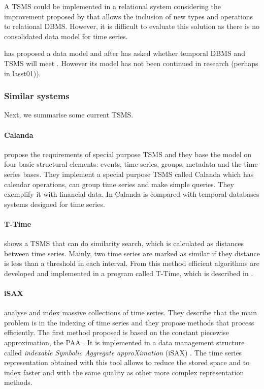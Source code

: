 A TSMS could be implemented in a relational system considering the improvement proposed by \textcite{stonebraker86} that allows the inclusion of new types and operations to relational DBMS. However, it is difficult to evaluate this solution as there is no consolidated data model  for time series. 

\textcite{dreyer94} has proposed a data model and after has asked whether temporal DBMS and TSMS will meet \parencite{schmidt95}. However its model has not been continued in research (perhaps in lasst01)).



\subsubsection{Similar systems}
Next, we summarise some current TSMS.

\paragraph{Calanda} \textcite{dreyer94} propose the requirements of special purpose TSMS and they  base the model on four basic structural elements: events, time series, groups, metadata and the time series bases. They implement a special purpose TSMS \parencite{dreyer94b,dreyer95,dreyer95b} called Calanda which has calendar operations, can group time series and make simple queries. They exemplify it with financial data. In \cite{schmidt95} Calanda is compared with temporal databases systems designed for time series.


\paragraph{T-Time}  \textcite{assfalg08:thesis} shows a TSMS that can do similarity search, which is calculated as distances between time series. Mainly, two time series are marked as similar if they distance is less than a threshold in each interval. From this method efficient algorithms are developed and implemented in a program called T-Time, which is described in \cite{assfalg08:ttime}.

 
\paragraph{iSAX} \textcite{keogh08:isax,keogh10:isax} analyse and index massive collections of time series. They describe that the main problem is in the indexing of time series and they propose methods that process efficiently. The first method proposed is based on the constant piecewise approximation, the PAA \parencite{keogh00}. It is implemented in a data management structure called \emph{indexable Symbolic Aggregate approXimation} (iSAX) \parencite{isax}. The time series representation obtained with this tool allows to reduce the stored space and to index faster and with the same quality as other more complex representation methods.
 

